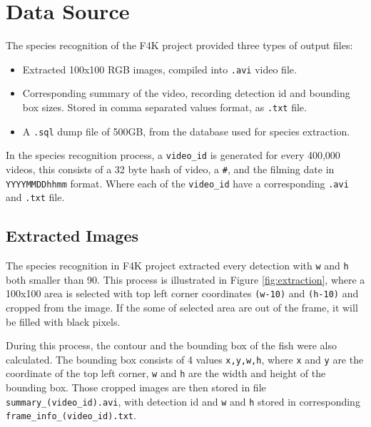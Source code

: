 \documentclass[bsc,logo,twoside,fullspacing,parskip]{infthesis}
\begin{document}

\chapter{Data Source}
\label{chap:datasource}

The species recognition of the F4K project provided three types of output files:
\begin{itemize}
\setlength{\parskip}{1pt}
\item
Extracted 100x100 RGB images, compiled into {\tt .avi} video file.
\item
Corresponding summary of the video, recording detection id and bounding box sizes. Stored in comma separated values format, as {\tt .txt} file.
\item
A {\tt .sql} dump file of 500GB, from the database used for species extraction.
\end{itemize}

In the species recognition process, a {\tt video\_id} is generated for every 400,000 videos, this consists of a 32 byte hash of video, a {\tt \#}, and the filming date in {\tt YYYYMMDDhhmm} format. Where each of the {\tt video\_id} have a corresponding {\tt .avi} and {\tt .txt} file.

\section{Extracted Images}
\label{sec:summaries}

The species recognition in F4K project extracted every detection with {\tt w} and {\tt h} both smaller than 90. 
This process is illustrated in Figure \ref{fig:extraction}, where a 100x100 area is selected with top left corner coordinates {\tt (w-10)} and {\tt (h-10)} and cropped from the image.
If the some of selected area are out of the frame, it will be filled with black pixels.

During this process, the contour and the bounding box of the fish were also calculated.
The bounding box consists of 4 values {\tt x,y,w,h}, where {\tt x} and {\tt y} are the coordinate of the top left corner, {\tt w} and {\tt h} are the width and height of the bounding box. 
Those cropped images are then stored in file {\tt summary\_(video\_id).avi}, with detection id and {\tt w} and {\tt h} stored in corresponding {\tt frame\_info\_(video\_id).txt}.
\end{document}
